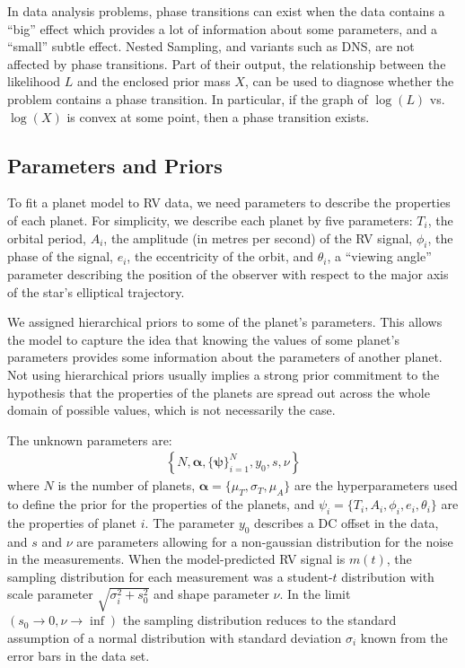 \documentclass[useAMS,usenatbib]{mn2e}
\begin{document}
In data analysis problems, phase transitions can exist when the data contains
a ``big'' effect which provides a lot of information about some parameters, and
a ``small'' subtle effect.
Nested Sampling, and variants such as DNS, are not affected
by phase transitions. Part of their output, the relationship between the
likelihood $L$ and the enclosed prior mass $X$, can be used to diagnose whether the
problem contains a phase transition. In particular, if the graph of $\log(L)$
vs. $\log(X)$ is convex at some point, then a phase transition exists.

\subsection{Parameters and Priors}
To fit a planet model to RV data, we need parameters to describe
the properties of each planet. For simplicity, we describe each planet by
five parameters: $T_i$, the orbital period, $A_i$, the amplitude (in metres
per second) of the RV signal, $\phi_i$, the phase of the signal, $e_i$, the eccentricity of the orbit, and $\theta_i$, a ``viewing angle'' parameter
describing the position of the observer with respect to the major axis of the
star's elliptical trajectory.

We assigned hierarchical priors to some of the planet's parameters. This allows the
model to capture the idea that knowing the values of some planet's parameters
provides some information about the parameters of another planet. Not using
hierarchical priors usually implies a strong prior commitment to the hypothesis
that the properties of the planets are spread out across the whole domain of
possible values, which is not necessarily the case.

The unknown parameters are:
\begin{eqnarray}
\left\{N, \boldsymbol{\alpha}, \{\boldsymbol{\psi}\}_{i=1}^N, y_0, s, \nu\right\}
\end{eqnarray}
where $N$ is the number of planets,
$\boldsymbol{\alpha} = \{\mu_T, \sigma_T, \mu_A\}$ are the
hyperparameters used to define the prior for the properties of the planets,
and $\psi_i = \{T_i, A_i, \phi_i, e_i, \theta_i\}$
are the properties of planet $i$.
The parameter $y_0$ describes a DC offset in the data, and $s$ and $\nu$ are
parameters allowing for a non-gaussian distribution for the noise in the
measurements. When the model-predicted RV signal is $m(t)$, the sampling
distribution for each measurement was a student-$t$ distribution with
scale parameter $\sqrt{\sigma_i^2 + s_0^2}$ and shape parameter $\nu$. In the limit
$(s_0 \to 0, \nu \to \inf)$ the sampling distribution reduces to the standard
assumption of a normal distribution with standard deviation $\sigma_i$ known
from the error bars in the data set.
\end{document}
